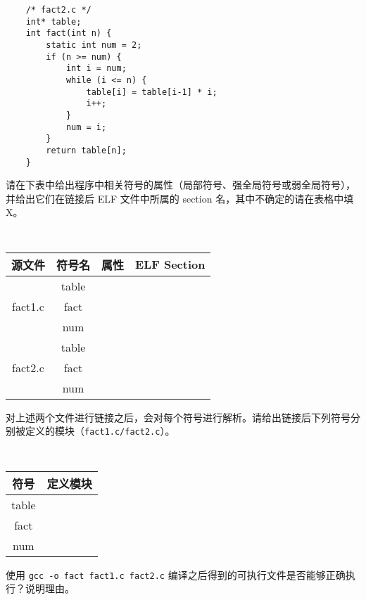 \begin{problems}
\begin{verbatim}
    /* fact2.c */
    int* table;
    int fact(int n) {
        static int num = 2;
        if (n >= num) {
            int i = num;
            while (i <= n) {
                table[i] = table[i-1] * i;
                i++;
            }
            num = i;
        }
        return table[n];
    }
        \end{verbatim}
        \qn 请在下表中给出程序中相关符号的属性（局部符号、强全局符号或弱全局符号），并给出它们在链接后 ELF 文件中所属的 section 名，其中不确定的请在表格中填 X。
        \begin{table}[H]
            \tt
            \centering
            \begin{tabular}{|c|c|c|c|}
                \hline
                源文件 & 符号名 & {\qquad \qquad 属性 \qquad \qquad} & {\qquad \qquad ELF Section \qquad \qquad} \\ \hline
                \multirow{3}{*}{fact1.c} & table &  &  \\ \cline{2-4} 
                & fact &  &  \\ \cline{2-4} 
                & num &  &  \\ \hline
                \multirow{3}{*}{fact2.c} & table &  &  \\ \cline{2-4} 
                & fact &  &  \\ \cline{2-4} 
                & num &  &  \\ \hline
            \end{tabular}
        \end{table}
        \qn 对上述两个文件进行链接之后，会对每个符号进行解析。请给出链接后下列符号分别被定义的模块（\verb|fact1.c/fact2.c|）。
        \begin{table}[H]
            \tt
            \centering
            \begin{tabular}{|c|c|}
                \hline
                符号 & {\qquad \qquad 定义模块 \qquad \qquad} \\ \hline
                table &  \\ \hline
                fact &  \\ \hline
                num &  \\ \hline
            \end{tabular}
        \end{table}
        \qn 使用 \verb|gcc -o fact fact1.c fact2.c| 编译之后得到的可执行文件是否能够正确执行？说明理由。
    \end{problems}